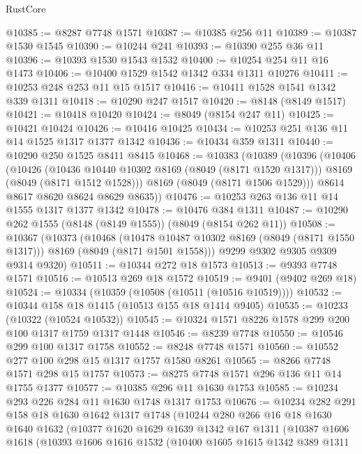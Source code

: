 \begin{lexlean}{RustCore}
\begin{coremodule}
@10385 := @8287 @7748 @1571
@10387 := @10385 @256 @11
@10389 := @10387 @1530 @1545
@10390 := @10244 @241
@10393 := @10390 @255 @36 @11
@10396 := @10393 @1530 @1543 @1532
@10400 := @10254 @254 @11 @16 @1473
@10406 := @10400 @1529 @1542 @1342 @334 @1311 @10276
@10411 := @10253 @248 @253 @11 @15 @1517
@10416 := @10411 @1528 @1541 @1342 @339 @1311
@10418 := @10290 @247 @1517
@10420 := @8148 (@8149 @1517)
@10421 := @10418 @10420
@10424 := @8049 (@8154 @247 @11)
@10425 := @10421 @10424
@10426 := @10416 @10425
@10434 := @10253 @251 @136 @11 @14 @1525 @1317 @1377 @1342
@10436 := @10434 @359 @1311
@10440 := @10290 @250 @1525 @8411 @8415
@10468 := @10383
    (@10389
      (@10396
        (@10406
          (@10426
            (@10436 @10440 @10302 @8169 (@8049 (@8171 @1520 @1317)))
            @8169
            (@8049 (@8171 @1512 @1528)))
          @8169
          (@8049 (@8171 @1506 @1529)))
        @8614
        @8617
        @8620
        @8624
        @8629
        @8635))
@10476 := @10253 @263 @136 @11 @14 @1555 @1317 @1377 @1342
@10478 := @10476 @384 @1311
@10487 := @10290 @262 @1555 (@8148 (@8149 @1555)) (@8049 (@8154 @262 @11))
@10508 := @10367
    (@10373
      (@10468
        (@10478 @10487 @10302 @8169 (@8049 (@8171 @1550 @1317)))
        @8169
        (@8049 (@8171 @1501 @1558)))
      @9299
      @9302
      @9305
      @9309
      @9314
      @9320)
@10511 := @10344 @272 @18 @1573
@10513 := @9393 @7748 @1571
@10516 := @10513 @269 @18 @1572
@10519 := @9401 (@9402 @269 @18)
@10524 := @10334 (@10359 (@10508 (@10511 (@10516 @10519))))
@10532 := @10344 @158 @18 @1415 (@10513 @155 @18 @1414 @9405)
@10535 := @10233 (@10322 (@10524 @10532))
@10545 := @10324 @1571 @8226 @1578 @299 @200 @100 @1317 @1759 @1317 @1448
@10546 := @8239 @7748
@10550 := @10546 @299 @100 @1317 @1758
@10552 := @8248 @7748 @1571
@10560 := @10552 @277 @100 @298 @15 @1317 @1757 @1580 @8261
@10565 := @8266 @7748 @1571 @298 @15 @1757
@10573 := @8275 @7748 @1571 @296 @136 @11 @14 @1755 @1377
@10577 := @10385 @296 @11 @1630 @1753
@10585 := @10234 @293 @226 @284 @11 @1630 @1748 @1317 @1753
@10676 := @10234
    @282
    @291
    @158
    @18
    @1630
    @1642
    @1317
    @1748
    (@10244
      @280
      @266
      @16
      @18
      @1630
      @1640
      @1632
      (@10377
        @1620
        @1629
        @1639
        @1342
        @167
        @1311
        (@10387
          @1606
          @1618
          (@10393
            @1606
            @1616
            @1532
            (@10400
              @1605
              @1615
              @1342
              @389
              @1311

\end{coremodule}
\end{lexlean}
